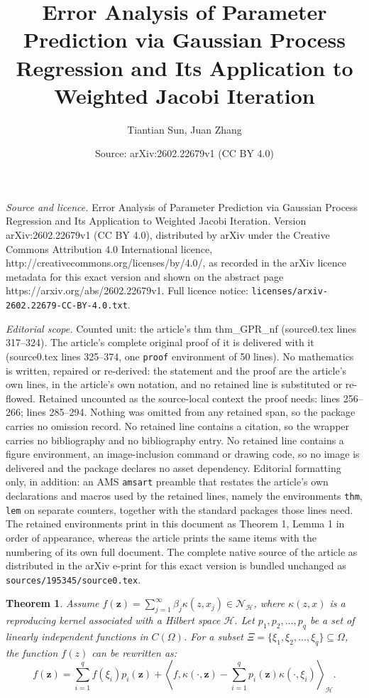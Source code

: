 \documentclass[10pt,a4paper]{amsart}
\title{{ Error Analysis of Parameter Prediction via Gaussian Process Regression and Its Application to Weighted Jacobi Iteration}}
\author{Tiantian Sun, Juan Zhang}
\date{Source: arXiv:2602.22679v1 (CC BY 4.0)}
\newtheorem{thm}{Theorem}
\begin{document}
\maketitle

\noindent\emph{Source and licence.} { Error Analysis of Parameter Prediction via Gaussian Process Regression and Its Application to Weighted Jacobi Iteration}. Version arXiv:2602.22679v1 (CC BY 4.0), distributed by arXiv under the Creative Commons Attribution 4.0 International licence, http://creativecommons.org/licenses/by/4.0/, as recorded in the arXiv licence metadata for this exact version and shown on the abstract page https://arxiv.org/abs/2602.22679v1. Full licence notice: \texttt{licenses/arxiv-2602.22679-CC-BY-4.0.txt}.\par\smallskip

\noindent\textit{Editorial scope.} Counted unit: the article's thm thm\_GPR\_nf (source0.tex lines 317--324). The article's complete original proof of it is delivered with it (source0.tex lines 325--374, one \texttt{proof} environment of 50 lines). No mathematics is written, repaired or re-derived: the statement and the proof are the article's own lines, in the article's own notation, and no retained line is substituted or re-flowed.  Retained uncounted as the source-local context the proof needs: lines 256--266; lines 285--294.  Nothing was omitted from any retained span, so the package carries no omission record.  No retained line contains a citation, so the wrapper carries no bibliography and no bibliography entry.  No retained line contains a figure environment, an image-inclusion command or drawing code, so no image is delivered and the package declares no asset dependency.  Editorial formatting only, in addition: an AMS \texttt{amsart} preamble that restates the article's own declarations and macros used by the retained lines, namely the environments \texttt{thm}, \texttt{lem} on separate counters, together with the standard packages those lines need.  The retained environments print in this document as Theorem 1, Lemma 1 in order of appearance, whereas the article prints the same items with the numbering of its own full document.  The complete native source of the article as distributed in the arXiv e-print for this exact version is bundled unchanged as \texttt{sources/195345/source0.tex}.
\begin{thm}
	\label{thm_Xi}
	Assume $f(\boldsymbol{z}) = \sum\limits_{j=1}^{\infty} \beta_j \kappa (z,x_j) \in \mathcal{N}_\mathcal{H}$, where $\kappa(z,x)$ is a reproducing kernel associated with a Hilbert space $\mathcal{H}$. Let  $p_1,p_2,\dots,p_q$ be a set of linearly independent functions in $C(\Omega)$. 
	For a subset $\Xi = \{\xi_1,\xi_2,\dots,\xi_q \} \subseteq \Omega$, the function $f(z)$ can be rewritten as:
	\begin{equation}
		\label{pro_f_z}
		f(\boldsymbol{z}) = \sum\limits_{i = 1}^q f(\xi_i) p_i(\boldsymbol{z}) +\left\langle f,\kappa(\cdot,\boldsymbol{z})-\sum\limits_{i= 1}^q p_i(\boldsymbol{z})\kappa(\cdot,\xi_i) \right\rangle_\mathcal{H}.
	\end{equation}
	
\end{thm}
\end{document}
